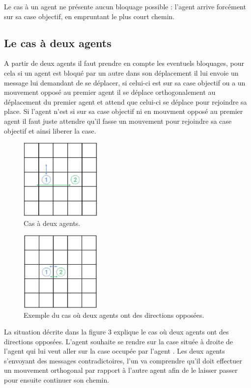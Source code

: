 \documentclass[a4paper, 12pt,twocolumn, french]{article}
\newcommand*\circled[1]{
	\tikz[baseline=(char.base)]{
		\node[shape=circle,draw,inner sep=2pt] (char) {#1};
	}
}
\begin{document}
Le cas à un agent ne présente aucun bloquage possible : l'agent arrive forcément sur sa case objectif, en empruntant le plus court chemin.

\subsection{Le cas à deux agents}

A partir de deux agents il faut prendre en compte les eventuels bloquages, pour cela si un agent est bloqué par un autre dans son déplacement il lui envoie un message lui demandant de se déplacer, si celui-ci est sur sa case objectif ou a un mouvement opposé au premier agent il se déplace orthogonalement au déplacement du premier agent et attend que celui-ci se déplace pour rejoindre sa place. Si l'agent n'est si sur sa case objectif ni en mouvment opposé au premier agent il faut juste attendre qu'il fasse un mouvement pour rejoindre sa case objectif et ainsi liberer la case.

\begin{figure}[h]
	\centering
	\includegraphics[width=150px]{images/2_agents.png}
	\caption{Cas à deux agents.}
\end{figure}


\begin{figure}[h]
	\centering
	\includegraphics[width=150px]{images/switch.png}
	\caption{Exemple du cas où deux agents ont des directions opposées.}
\end{figure}

La situation décrite dans la figure 3 explique le cas où deux agents ont des directions opposées. L'agent \circled{1} souhaite se rendre sur la case située à droite de l'agent \circled{2} qui lui veut aller sur la case occupée par l'agent \circled{1}. Les deux agents s'envoyant des messages contradictoires, l'un va comprendre qu'il doit effectuer un mouvement orthogonal par rapport à l'autre agent afin de le laisser passer pour ensuite continuer son chemin.
\end{document}
